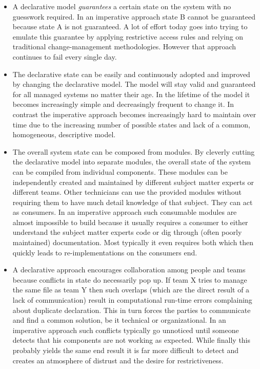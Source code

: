 \documentclass[12pt, a4paper]{article}
\begin{document}
\begin{itemize}
  \item A declarative model \textit{guarantees} a certain state on the system with no guesswork required. In an imperative approach state B cannot be guaranteed because state A is not guaranteed. A lot of effort today goes into trying to emulate this guarantee by applying restrictive access rules and relying on traditional change-management methodologies. However that approach continues to fail every single day.

  \item The declarative state can be easily and continuously adopted and improved by changing the declarative model. The model will stay valid and guaranteed for all managed systems no matter their age. In the lifetime of the model it becomes increasingly simple and decreasingly frequent to change it. In contrast the imperative approach becomes increasingly hard to maintain over time due to the increasing number of possible states and lack of a common, homogeneous, descriptive model.

  \item The overall system state can be composed from modules. By cleverly cutting the declarative model into separate modules, the overall state of the system can be compiled from individual components. These modules can be independently created and maintained by different subject matter experts or different teams. Other technicians can use the provided modules without requiring them to have much detail knowledge of that subject. They can act as consumers. In an imperative approach such consumable modules are almost impossible to build because it usually requires a consumer to either understand the subject matter experts code or dig through (often poorly maintained) documentation. Most typically it even requires both which then quickly leads to re-implementations on the consumers end.

  \item A declarative approach encourages collaboration among people and teams because conflicts in state do necessarily pop up. If team X tries to manage the same file as team Y then such overlaps (which are the direct result of a lack of communication) result in computational run-time errors complaining about duplicate declaration. This in turn forces the parties to communicate and find a  common solution, be it technical or organizational. In an imperative approach such conflicts typically go unnoticed until someone detects that his components are not working as expected. While finally this probably yields the same end result it is far more difficult to detect and creates an atmosphere of distrust and the desire for restrictiveness.


\end{itemize}
\end{document}
